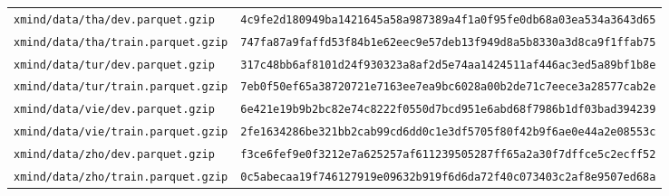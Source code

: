 \begin{longtable}{p{5.0cm}p{9.5cm}}
\texttt{\scriptsize xmind/data/tha/dev.parquet.gzip} & \texttt{\scriptsize 4c9fe2d180949ba1421645a58a987389\hspace{0pt}a4f1a0f95fe0db68a03ea534a3643d65}\\
\texttt{\scriptsize xmind/data/tha/train.parquet.gzip} & \texttt{\scriptsize 747fa87a9faffd53f84b1e62eec9e57d\hspace{0pt}eb13f949d8a5b8330a3d8ca9f1ffab75}\\
\texttt{\scriptsize xmind/data/tur/dev.parquet.gzip} & \texttt{\scriptsize 317c48bb6af8101d24f930323a8af2d5\hspace{0pt}e74aa1424511af446ac3ed5a89bf1b8e}\\
\texttt{\scriptsize xmind/data/tur/train.parquet.gzip} & \texttt{\scriptsize 7eb0f50ef65a38720721e7163ee7ea9b\hspace{0pt}c6028a00b2de71c7eece3a28577cab2e}\\
\texttt{\scriptsize xmind/data/vie/dev.parquet.gzip} & \texttt{\scriptsize 6e421e19b9b2bc82e74c8222f0550d7b\hspace{0pt}cd951e6abd68f7986b1df03bad394239}\\
\texttt{\scriptsize xmind/data/vie/train.parquet.gzip} & \texttt{\scriptsize 2fe1634286be321bb2cab99cd6dd0c1e\hspace{0pt}3df5705f80f42b9f6ae0e44a2e08553c}\\
\texttt{\scriptsize xmind/data/zho/dev.parquet.gzip} & \texttt{\scriptsize f3ce6fef9e0f3212e7a625257af61123\hspace{0pt}9505287ff65a2a30f7dffce5c2ecff52}\\
\texttt{\scriptsize xmind/data/zho/train.parquet.gzip} & \texttt{\scriptsize 0c5abecaa19f746127919e09632b919f\hspace{0pt}6d6da72f40c073403c2af8e9507ed68a}\\
\end{longtable}
